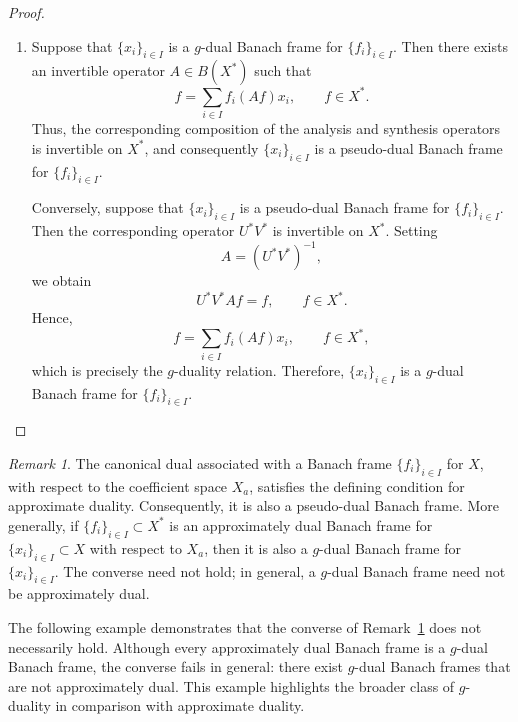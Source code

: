 \documentclass[12pt]{article}
\theoremstyle{definition}
\theoremstyle{remark}
\newtheorem{remark}[theorem]{Remark}
\begin{document}
\begin{proof}
\begin{enumerate}
		\item Suppose that \(\{x_i\}_{i\in I}\) is a \(g\)-dual Banach frame
		for \(\{f_i\}_{i\in I}\). Then there exists an invertible operator
		\(A\in B(X^*)\) such that
		\[
		f
		=
		\sum_{i\in I}f_i(Af)x_i,
		\qquad f\in X^*.
		\]
		Thus, the corresponding composition of the analysis and synthesis
		operators is invertible on \(X^*\), and consequently
		\(\{x_i\}_{i\in I}\) is a pseudo-dual Banach frame for
		\(\{f_i\}_{i\in I}\).
		
		Conversely, suppose that \(\{x_i\}_{i\in I}\) is a pseudo-dual
		Banach frame for \(\{f_i\}_{i\in I}\). Then the corresponding
		operator \(U^*V^*\) is invertible on \(X^*\). Setting
		\[
		A=(U^*V^*)^{-1},
		\]
		we obtain
		\[
		U^*V^*Af=f,
		\qquad f\in X^*.
		\]
		Hence,
		\[
		f
		=
		\sum_{i\in I}f_i(Af)x_i,
		\qquad f\in X^*,
		\]
		which is precisely the \(g\)-duality relation. Therefore,
		\(\{x_i\}_{i\in I}\) is a \(g\)-dual Banach frame for
		\(\{f_i\}_{i\in I}\).
	\end{enumerate}
\end{proof}

\begin{remark}\label{rem:dual}
	The canonical dual associated with a Banach frame
	\(\{f_i\}_{i\in I}\) for \(X\), with respect to the coefficient space
	\(X_a\), satisfies the defining condition for approximate duality.
	Consequently, it is also a pseudo-dual Banach frame. More generally, if
	\(\{f_i\}_{i\in I}\subset X^*\) is an approximately dual Banach frame
	for \(\{x_i\}_{i\in I}\subset X\) with respect to \(X_a\), then it is
	also a \(g\)-dual Banach frame for \(\{x_i\}_{i\in I}\). The converse
	need not hold; in general, a \(g\)-dual Banach frame need not be
	approximately dual.
\end{remark}

The following example demonstrates that the converse of Remark~\ref{rem:dual} does not necessarily hold. Although every approximately dual Banach frame is a \(g\)-dual Banach frame, the converse fails in general: there exist \(g\)-dual Banach frames that are not approximately dual. This example highlights the broader class of \(g\)-duality in comparison with approximate duality.
\end{document}
